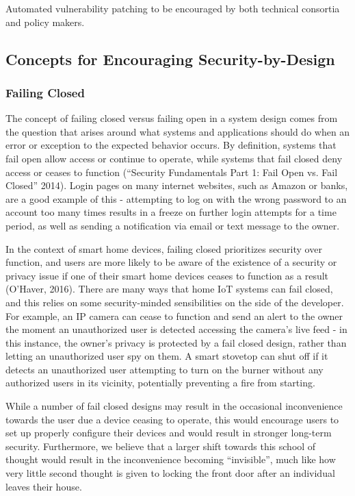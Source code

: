 Automated vulnerability patching to be encouraged by both technical consortia and policy makers.

\subsection{Concepts for Encouraging Security-by-Design}

\subsubsection{Failing Closed}

The concept of failing closed versus failing open in a system design comes from the question that arises around what systems and applications should do when an error or exception to the expected behavior occurs. By definition, systems that fail open allow access or continue to operate, while systems that fail closed deny access or ceases to function (“Security Fundamentals Part 1: Fail Open vs. Fail Closed” 2014). Login pages on many internet websites, such as Amazon or banks, are a good example of this - attempting to log on with the wrong password to an account too many times results in a freeze on further login attempts for a time period, as well as sending a notification via email or text message to the owner.

 In the context of smart home devices, failing closed prioritizes security over function, and users are more likely to be aware of the existence of a security or privacy issue if one of their smart home devices ceases to function as a result (O’Haver, 2016). There are many ways that home IoT systems can fail closed, and this relies on some security-minded sensibilities on the side of the developer. For example, an IP camera can cease to function and send an alert to the owner the moment an unauthorized user is detected accessing the camera’s live feed - in this instance, the owner’s privacy is protected by a fail closed design, rather than letting an unauthorized user spy on them. A smart stovetop can shut off if it detects an unauthorized user attempting to turn on the burner without any authorized users in its vicinity, potentially preventing a fire from starting.

While a number of fail closed designs may result in the occasional inconvenience towards the user due a device ceasing to operate, this would encourage users to set up properly configure their devices and would result in stronger long-term security. Furthermore, we believe that a larger shift towards this school of thought would result in the inconvenience becoming “invisible”, much like how very little second thought is given to locking the front door after an individual leaves their house.

